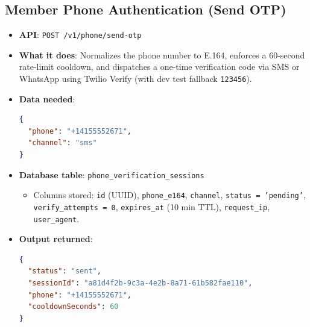 \documentclass[11pt,a4paper]{article}
\begin{document}
\subsection{Member Phone Authentication (Send OTP)}
\begin{itemize}
    \item \textbf{API}: \texttt{POST /v1/phone/send-otp}
    \item \textbf{What it does}: Normalizes the phone number to E.164, enforces a 60-second rate-limit cooldown, and dispatches a one-time verification code via SMS or WhatsApp using Twilio Verify (with dev test fallback \texttt{123456}).
    \item \textbf{Data needed}:
\begin{lstlisting}[language=json]
{
  "phone": "+14155552671",
  "channel": "sms"
}
\end{lstlisting}
    \item \textbf{Database table}: \texttt{phone\_verification\_sessions}
    \begin{itemize}
        \item Columns stored: \texttt{id} (UUID), \texttt{phone\_e164}, \texttt{channel}, \texttt{status = 'pending'}, \texttt{verify\_attempts = 0}, \texttt{expires\_at} (10 min TTL), \texttt{request\_ip}, \texttt{user\_agent}.
    \end{itemize}
    \item \textbf{Output returned}:
\begin{lstlisting}[language=json]
{
  "status": "sent",
  "sessionId": "a81d4f2b-9c3a-4e2b-8a71-61b582fae110",
  "phone": "+14155552671",
  "cooldownSeconds": 60
}
\end{lstlisting}
\end{itemize}
\end{document}
